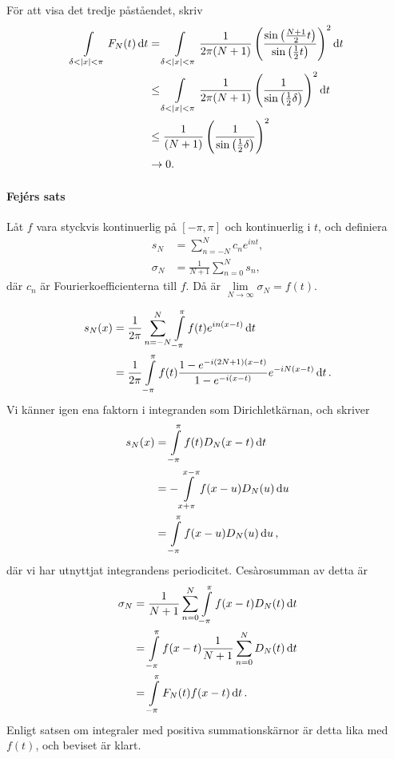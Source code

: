 För att visa det tredje påståendet, skriv
\begin{align*}
	\int\limits_{\delta < \abs{x} < \pi}^{}F_{N}(t)\dd{t} &= \int\limits_{\delta < \abs{x} < \pi}^{}\frac{1}{2\pi (N + 1)}\left(\frac{\sin{\left(\frac{N + 1}{2}t\right)}}{\sin{\left(\frac{1}{2}t\right)}}\right)^{2}\dd{t} \\
	                                                &\leq \int\limits_{\delta < \abs{x} < \pi}^{}\frac{1}{2\pi (N + 1)}\left(\frac{1}{\sin{\left(\frac{1}{2}\delta\right)}}\right)^{2}\dd{t} \\
	                                                &\leq \frac{1}{(N + 1)}\left(\frac{1}{\sin{\left(\frac{1}{2}\delta\right)}}\right)^{2} \\
	                                                &\to 0. 
\end{align*}

\paragraph{Fejérs sats}
Låt $f$ vara styckvis kontinuerlig på $[-\pi, \pi]$ och kontinuerlig i $t$, och definiera
\begin{align*}
	s_{N}      &= \sum\limits_{n = -N}^{N}c_{n}e^{int}, \\
	\sigma_{N} &= \frac{1}{N + 1}\sum\limits_{n = 0}^{N}s_{n},
\end{align*}
där $c_{n}$ är Fourierkoefficienterna till $f$. Då är $\lim\limits_{N\to\infty}\sigma_{N} = f(t)$.

\proof
\begin{align*}
	s_{N}(x) &= \frac{1}{2\pi}\sum\limits_{n = -N}^{N}\int\limits_{-\pi}^{\pi}f(t)e^{in(x - t)}\dd{t} \\
	         &= \frac{1}{2\pi}\int\limits_{-\pi}^{\pi}f(t)\frac{1 - e^{-i(2N + 1)(x - t)}}{1 - e^{-i(x - t)}}e^{-iN(x - t)}\dd{t}.
\end{align*}
Vi känner igen ena faktorn i integranden som Dirichletkärnan, och skriver
\begin{align*}
	s_{N}(x) &= \int\limits_{-\pi}^{\pi}f(t)D_{N}(x - t)\dd{t} \\
	         &= -\int\limits_{x + \pi}^{x - \pi}f(x - u)D_{N}(u)\dd{u} \\
	         &= \int\limits_{-\pi}^{\pi}f(x - u)D_{N}(u)\dd{u},
\end{align*}
där vi har utnyttjat integrandens periodicitet. Cesàrosumman av detta är
\begin{align*}
	\sigma_{N} &= \frac{1}{N + 1}\sum\limits_{n = 0}^{N}\int\limits_{-\pi}^{\pi}f(x - t)D_{N}(t)\dd{t} \\
	           &= \int\limits_{-\pi}^{\pi}f(x - t)\frac{1}{N + 1}\sum\limits_{n = 0}^{N}D_{N}(t)\dd{t} \\
	           &= \int\limits_{-\pi}^{\pi}F_{N}(t)f(x - t)\dd{t}.
\end{align*}
Enligt satsen om integraler med positiva summationskärnor är detta lika med $f(t)$, och beviset är klart.

